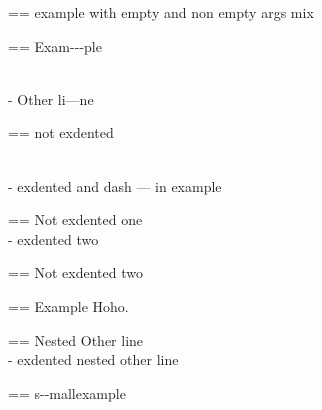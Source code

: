 \documentclass{book}
\makeatletter
\newenvironment{Texinfopreformatted}{%
  \par\GNUTobeylines\obeyspaces\frenchspacing\parskip=\z@\parindent=\z@}{}
{\catcode`\^^M=13 \gdef\GNUTobeylines{\catcode`\^^M=13 \def^^M{\null\par}}}
\newenvironment{Texinfoindented}{\begin{list}{}{}\item\relax}{\end{list}}
\renewcommand{\_}{\Texinfounderscore\discretionary{}{}{}}
\makeatother
\begin{document}
\begin{titlepage}
\begin{Texinfoindented}
\begin{Texinfopreformatted}%
\ttfamily example with empty and non empty args mix
\end{Texinfopreformatted}
\end{Texinfoindented}

\begin{Texinfoindented}
\begin{Texinfopreformatted}%
\ttfamily Exam{-}{-}{-}ple

\end{Texinfopreformatted}
\leavevmode{}\\
\hbox{\kern -\leftmargin}%
Other li---ne
\\
\begin{Texinfopreformatted}%
\ttfamily not exdented
\end{Texinfopreformatted}
\end{Texinfoindented}

\begin{Texinfoindented}
\leavevmode{}\\
\hbox{\kern -\leftmargin}%
exdented  and dash --- in example
\\
\begin{Texinfopreformatted}%
\ttfamily Not exdented one
\end{Texinfopreformatted}
\leavevmode{}\\
\hbox{\kern -\leftmargin}%
exdented two
\\
\begin{Texinfopreformatted}%
\ttfamily Not exdented two
\end{Texinfopreformatted}
\end{Texinfoindented}

\begin{Texinfoindented}
\begin{Texinfopreformatted}%
\ttfamily Example   Hoho.
\end{Texinfopreformatted}
\begin{Texinfoindented}
\begin{Texinfopreformatted}%
\ttfamily Nested Other line
\end{Texinfopreformatted}
\leavevmode{}\\
\hbox{\kern -\leftmargin}%
exdented nested other line
\\
\end{Texinfoindented}
\end{Texinfoindented}

\begin{Texinfopreformatted}%
\ttfamily \footnotesize s{-}{-}mallexample
\end{Texinfopreformatted}


\end{titlepage}
\end{document}
